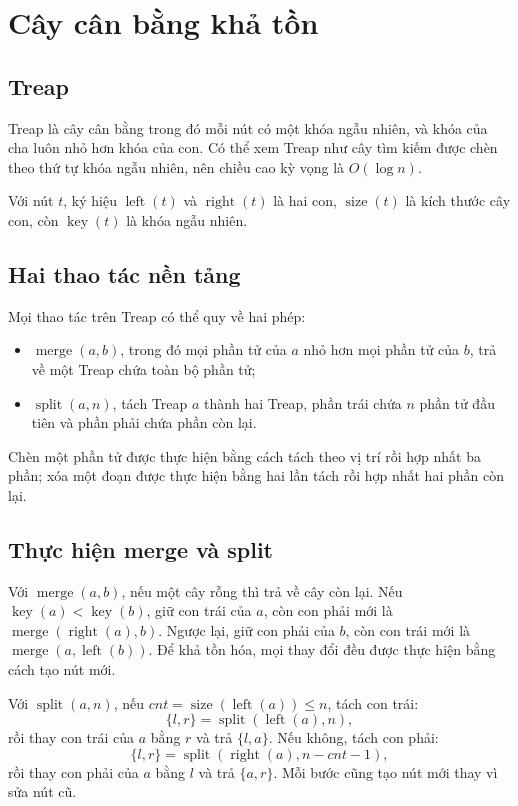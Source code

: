 \documentclass[11pt]{article}
\begin{document}
\section{Cây cân bằng khả tồn}

\subsection{Treap}

Treap là cây cân bằng trong đó mỗi nút có một khóa ngẫu nhiên, và khóa
của cha luôn nhỏ hơn khóa của con. Có thể xem Treap như cây tìm kiếm
được chèn theo thứ tự khóa ngẫu nhiên, nên chiều cao kỳ vọng là
$O(\log n)$.

Với nút $t$, ký hiệu $\operatorname{left}(t)$ và
$\operatorname{right}(t)$ là hai con, $\operatorname{size}(t)$ là kích
thước cây con, còn $\operatorname{key}(t)$ là khóa ngẫu nhiên.

\subsection{Hai thao tác nền tảng}

Mọi thao tác trên Treap có thể quy về hai phép:
\begin{itemize}
  \item $\operatorname{merge}(a,b)$, trong đó mọi phần tử của $a$ nhỏ
  hơn mọi phần tử của $b$, trả về một Treap chứa toàn bộ phần tử;
  \item $\operatorname{split}(a,n)$, tách Treap $a$ thành hai Treap,
  phần trái chứa $n$ phần tử đầu tiên và phần phải chứa phần còn lại.
\end{itemize}

Chèn một phần tử được thực hiện bằng cách tách theo vị trí rồi hợp nhất
ba phần; xóa một đoạn được thực hiện bằng hai lần tách rồi hợp nhất hai
phần còn lại.

\subsection{Thực hiện merge và split}

Với $\operatorname{merge}(a,b)$, nếu một cây rỗng thì trả về cây còn
lại. Nếu $\operatorname{key}(a)<\operatorname{key}(b)$, giữ con trái
của $a$, còn con phải mới là $\operatorname{merge}(\operatorname{right}(a),b)$.
Ngược lại, giữ con phải của $b$, còn con trái mới là
$\operatorname{merge}(a,\operatorname{left}(b))$. Để khả tồn hóa, mọi
thay đổi đều được thực hiện bằng cách tạo nút mới.

Với $\operatorname{split}(a,n)$, nếu
$cnt=\operatorname{size}(\operatorname{left}(a))\le n$, tách con trái:
\[
  \{l,r\}=\operatorname{split}(\operatorname{left}(a),n),
\]
rồi thay con trái của $a$ bằng $r$ và trả $\{l,a\}$. Nếu không, tách
con phải:
\[
  \{l,r\}=\operatorname{split}(\operatorname{right}(a),n-cnt-1),
\]
rồi thay con phải của $a$ bằng $l$ và trả $\{a,r\}$. Mỗi bước cũng tạo
nút mới thay vì sửa nút cũ.
\end{document}
